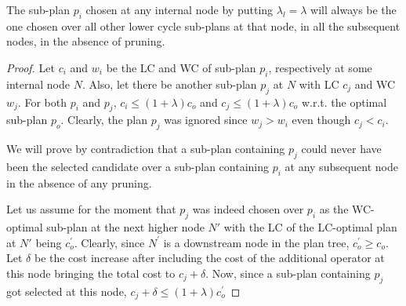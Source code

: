 \begin{theorem}
The sub-plan $p_i$ chosen at any internal node by putting $\lambda_l = \lambda$ will always be the one chosen over all other lower cycle sub-plans at that node, in all the subsequent nodes, in the absence of pruning.   
\end{theorem}

\begin{proof}
Let $c_i$ and $w_i$ be the LC and WC of sub-plan $p_i$, respectively at some internal node $N$. Also, let there be another sub-plan $p_j$ at $N$ with LC $c_j$ and WC $w_j$. For both $p_i$ and $p_j$, $c_i \le (1+
\lambda)c_o$ and $c_j \le (1+
\lambda)c_o$ w.r.t. the optimal sub-plan $p_o$. Clearly, the plan $p_j$ was ignored since $w_j > w_i$ even though $c_j < c_i$.

We will prove by contradiction that a sub-plan containing $p_j$ could never have been the selected candidate over a sub-plan containing $p_i$ at any subsequent node in the absence of any pruning. 

Let us assume for the moment that $p_j$ was indeed chosen over $p_i$ as the WC-optimal sub-plan at the next higher node $N'$ with the LC of the LC-optimal plan at $N'$ being $c_o^'$. 
Clearly, since $N^'$ is a downstream node in the plan tree, $c_o^' \ge c_o$. Let $\delta$ be the cost increase after including the cost of the additional operator at this node bringing the total cost to $c_j + \delta$. Now, since a sub-plan containing $p_j$ got selected at this node, $c_j + \delta \le (1+\lambda)c_o^{'}$ 
\end{proof}

